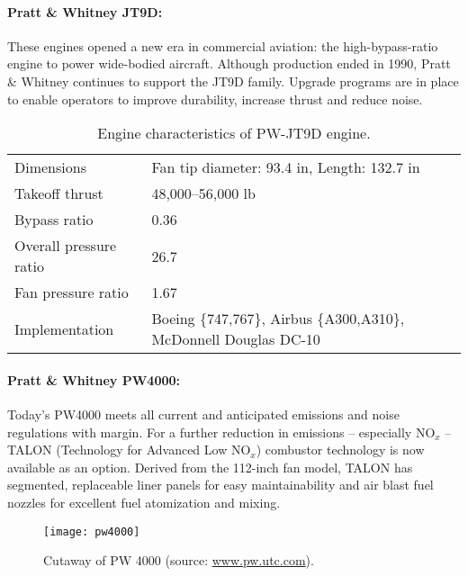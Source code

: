 \paragraph{Pratt \& Whitney JT9D:}
These engines opened a new era in commercial aviation: the high-bypass-ratio engine to power wide-bodied aircraft. Although production ended in 1990, Pratt \& Whitney continues to support the JT9D family. Upgrade programs are in place to enable operators to improve durability, increase thrust and reduce noise. 
\begin{table}[!htb!]
  \centering
\begin{tabular}{|p{}|p{}|}\hline
Dimensions & Fan tip diameter: 93.4 in, Length: 132.7 in\\
Takeoff thrust & 48,000--56,000 lb\\
Bypass ratio & 0.36\\
Overall pressure ratio& 26.7\\
Fan pressure ratio& 1.67\\
Implementation& Boeing \{747,767\},  Airbus \{A300,A310\}, McDonnell Douglas DC-10\\\hline
\end{tabular}
  \caption{\label{TAB_JT9D}Engine characteristics of PW-JT9D engine.}
\end{table}

\paragraph{Pratt \& Whitney PW4000:}
Today's PW4000 meets all current and anticipated emissions and noise regulations with margin. For a further reduction in emissions -- especially NO$_x$ -- TALON (Technology for Advanced Low NO$_x$) combustor technology is now available as an option. Derived from the 112-inch fan model, TALON has segmented, replaceable liner panels for easy maintainability and air blast fuel nozzles for excellent fuel
atomization and mixing.

\begin{figure}[!htb!]
 \centering
    {\texttt{[image: pw4000]}}
    \caption{\label{FIG_PW4000}Cutaway of PW 4000 (source: \url{www.pw.utc.com}).}
\end{figure}

